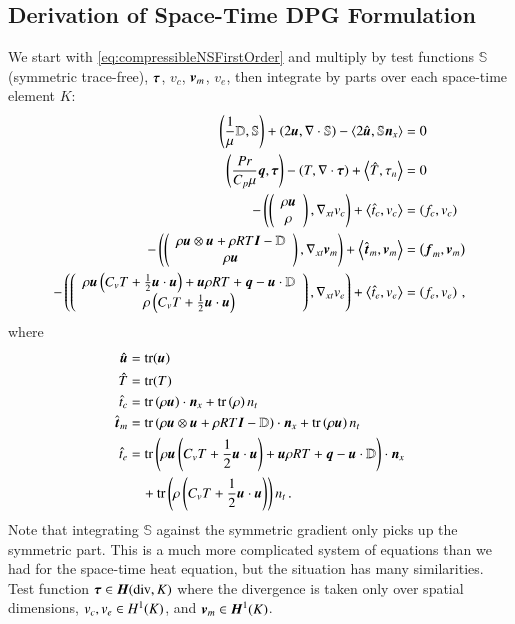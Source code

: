 \documentclass[preprint,12pt]{elsarticle}
\begin{document}
\subsection{Derivation of Space-Time DPG Formulation}
We start with \eqref{eq:compressibleNSFirstOrder} and multiply by test functions $\mathbb{S}$ (symmetric trace-free), $\bftau$,
$v_c$, $\bfv_m$, $v_e$, then integrate by parts over each space-time element $K$:
\begin{subequations}
\label{eq:compressibleNSBF}
\begin{align}
	\LRp{\frac{1}{\mu}\mathbb{D},\mathbb{S}}+\LRp{2\bfu,\Div\mathbb{S}}
	-\LRa{2\hat\bfu,\mathbb{S}\bfn_x}&=0\\
	\LRp{\frac{Pr}{C_p\mu}\bfq,\bftau}-\LRp{T,\Div\bftau}+\LRa{\hat T,\tau_n}&=0\\
	-\LRp{\vecttwo{\rho\bfu}{\rho},\Gradxt v_c}+\LRa{\hat t_c,v_c}&=\LRp{f_c,v_c}\\
	-\LRp{\vecttwo{\rho\bfu\otimes\bfu+\rho RT\bfI-\mathbb{D}}{\rho\bfu},\Gradxt\bfv_m}+\LRa{\hat\bft_m,\bfv_m}&=\LRp{\bff_m,\bfv_m}\\
	-\LRp{\vecttwo{\rho\bfu\LRp{C_v T+\frac{1}{2}\bfu\cdot\bfu}+\bfu\rho RT+\bfq-\bfu\cdot\mathbb{D}}{\rho\LRp{C_v T+\frac{1}{2}\bfu\cdot\bfu}},\Gradxt v_e}
	+\LRa{\hat t_e,v_e}&=\LRp{f_e,v_e}\,,
\end{align}
\end{subequations}
where 
\begin{equation*}
\begin{aligned}
\hat\bfu&=\trace(\bfu)\\
\hat T&=\trace(T)\\
\hat t_c&=\trace\LRp{\rho\bfu}\cdot\bfn_x
+\trace\LRp{\rho}n_t\\
\hat\bft_m&=\trace\LRp{\rho\bfu\otimes\bfu+\rho RT\bfI-\mathbb{D}}\cdot\bfn_x
+\trace\LRp{\rho\bfu} n_t\\
\hat t_e&=\trace\LRp{\rho\bfu\LRp{C_v T+\frac{1}{2}\bfu\cdot\bfu}+\bfu\rho RT+\bfq-\bfu\cdot\mathbb{D}}\cdot\bfn_x\\
&\quad+\trace\LRp{\rho\LRp{C_v T+\frac{1}{2}\bfu\cdot\bfu}}n_t\,.
\end{aligned}
\end{equation*}
Note that integrating $\mathbb{S}$ against the symmetric gradient only picks up the symmetric part.
This is a much more complicated system of equations than we had for the space-time heat equation, but the situation has many similarities.
Test function $\bftau\in\HdivK$ where the divergence is taken only over spatial dimensions, $v_c,v_e\in\HOneK$, and $\bfv_m\in\HOneVecK$.
\end{document}
